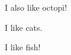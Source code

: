 \documentclass{article}
\begin{document}
I also like octopi!

I like cats.

I like fish!
\end{document}
